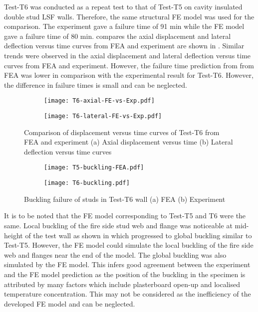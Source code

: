 Test-T6 was conducted as a repeat test to that of Test-T5 on cavity insulated double stud LSF walls. Therefore, the same structural FE model was used for the comparison. The experiment gave a failure time of 91 min while the FE model gave a failure time of 80 min.  compares the axial displacement and lateral deflection versus time curves from FEA and experiment are shown in . Similar trends were observed in the axial displacement and lateral deflection versus time curves from FEA and experiment. However, the failure time prediction from from FEA was lower in comparison with the experimental result for Test-T6. However, the difference in failure times is small and can be neglected.   
\begin{figure}[!htbp]
	\centering
	\begin{subfigure}[b]{0.7\textwidth}
		\centering
		\texttt{[image: T6-axial-FE-vs-Exp.pdf]}
		\caption{}
		\label{subfig:T6-axial-FE-vs-Exp}
	\end{subfigure}
	\begin{subfigure}[b]{0.7\textwidth}
		\centering
		\texttt{[image: T6-lateral-FE-vs-Exp.pdf]}
		\caption{}
		\label{subfig:T6-lateral-FE-vs-Exp}
	\end{subfigure}
	   \caption{Comparison of displacement versus time curves of Test-T6 from FEA and experiment (a) Axial displacement versus time (b) Lateral deflection versus time curves}
	   \label{fig:T6-structural-FE-vs-Exp}
\end{figure}    
\begin{figure}[!htbp]
	\centering
	\begin{subfigure}[b]{0.85\textwidth}
		\centering
		\texttt{[image: T5-buckling-FEA.pdf]}
		\caption{}
		\label{subfig:T6-buckling-FEA}
	\end{subfigure}
	\begin{subfigure}[b]{0.5\textwidth}
		\centering
		\texttt{[image: T6-buckling.pdf]}
		\caption{}
		\label{subfig:T6-buckling-FEA-Exp}
	\end{subfigure}
	   \caption{Buckling failure of studs in Test-T6 wall (a) FEA (b) Experiment}
	   \label{fig:T6-buckling-FE-vs-Exp}
\end{figure} 

It is to be noted that the FE model corresponding to Test-T5 and T6 were the same. Local buckling of the fire side stud web and flange was noticeable at mid-height of the test wall as shown in  which progressed to global buckling similar to Test-T5. However, the FE model could simulate the local buckling of the fire side web and flanges near the end of the model. The global buckling was also simulated by the FE model. This infers good agreement between the experiment and the FE model prediction as the position of the buckling in the specimen is attributed by many factors which include plasterboard open-up and localised temperature concentration. This may not be considered as the inefficiency of the developed FE model and can be neglected.

